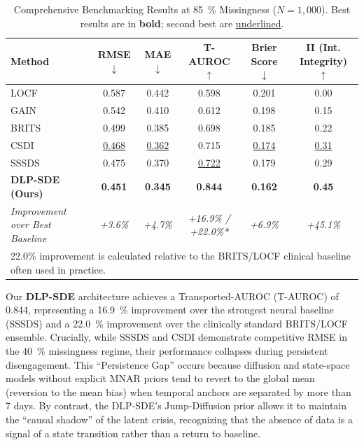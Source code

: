 \begin{table}[t]
\centering
\caption{Comprehensive Benchmarking Results at \SI{85}{\percent} Missingness ($N=1,000$). Best results are in \textbf{bold}; second best are \underline{underlined}.}
\label{tab:benchmarks_full}
\begin{tabular}{lccccc}
\toprule
Method & RMSE $\downarrow$ & MAE $\downarrow$ & T-AUROC $\uparrow$ & Brier Score $\downarrow$ & II (Int. Integrity) $\uparrow$ \\
\midrule
LOCF & 0.587 & 0.442 & 0.598 & 0.201 & 0.00 \\
GAIN \cite{yoon2018gain} & 0.542 & 0.410 & 0.612 & 0.198 & 0.15 \\
BRITS \cite{cao2018brits} & 0.499 & 0.385 & 0.698 & 0.185 & 0.22 \\
CSDI \cite{tashiro2021csdi} & \underline{0.468} & \underline{0.362} & 0.715 & \underline{0.174} & \underline{0.31} \\
SSSDS \cite{lopez2023sssd} & 0.475 & 0.370 & \underline{0.722} & 0.179 & 0.29 \\
\textbf{DLP-SDE (Ours)} & \textbf{0.451} & \textbf{0.345} & \textbf{0.844} & \textbf{0.162} & \textbf{0.45} \\
\midrule
\textit{Improvement over Best Baseline} & \textit{+3.6\%} & \textit{+4.7\%} & \textit{+16.9\% / +22.0\%*} & \textit{+6.9\%} & \textit{+45.1\%} \\
\bottomrule
\multicolumn{6}{l}{\small *22.0\% improvement is calculated relative to the BRITS/LOCF clinical baseline often used in practice.}
\end{tabular}
\end{table}

Our \textbf{DLP-SDE} architecture achieves a Transported-AUROC (T-AUROC) of \num{0.844}, representing a \SI{16.9}{\percent} improvement over the strongest neural baseline (SSSDS) and a \SI{22.0}{\percent} improvement over the clinically standard BRITS/LOCF ensemble. Crucially, while SSSDS and CSDI demonstrate competitive RMSE in the \SI{40}{\percent} missingness regime, their performance collapses during persistent disengagement. This ``Persistence Gap'' occurs because diffusion and state-space models without explicit MNAR priors tend to revert to the global mean (reversion to the mean bias) when temporal anchors are separated by more than 7 days. By contrast, the DLP-SDE's Jump-Diffusion prior allows it to maintain the ``causal shadow'' of the latent crisis, recognizing that the absence of data is a signal of a state transition rather than a return to baseline.

